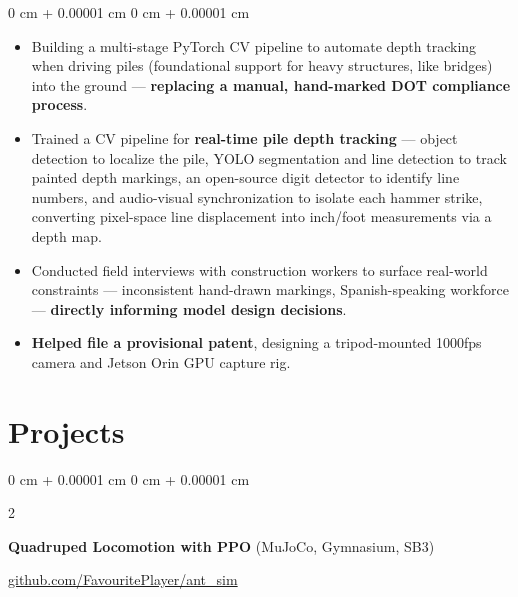 \documentclass[10pt, letterpaper]{article}
\newenvironment{highlights}{
    \begin{itemize}[
        topsep=0.3 cm,
        parsep=0.05 cm,
        partopsep=0pt,
        itemsep=0.02 cm,
        leftmargin=0 cm + 10pt
    ]
}{
    \end{itemize}
} %
\newenvironment{onecolentry}{
    \begin{adjustwidth}{
        0 cm + 0.00001 cm
    }{
        0 cm + 0.00001 cm
    }
}{
    \end{adjustwidth}
} %
\newenvironment{extendedtwocolentry}[2][]{
    \onecolentry
    \def\secondColumn{#2}
    \setcolumnwidth{\fill, 8 cm}
    \begin{paracol}{2}
}{
    \switchcolumn \raggedleft \secondColumn
    \end{paracol}
    \endonecolentry
}
\begin{document}
        \vspace{0.10 cm}
        \begin{onecolentry}
            \begin{highlights}
                \item Building a multi-stage PyTorch CV pipeline to automate depth tracking when driving piles (foundational support for heavy structures, like bridges) into the ground — \textbf{replacing a manual, hand-marked DOT compliance process}.
                \item Trained a CV pipeline for \textbf{real-time pile depth tracking} — object detection to localize the pile, YOLO segmentation and line detection to track painted depth markings, an open-source digit detector to identify line numbers, and audio-visual synchronization to isolate each hammer strike, converting pixel-space line displacement into inch/foot measurements via a depth map.
                \item Conducted field interviews with construction workers to surface real-world constraints — inconsistent hand-drawn markings, Spanish-speaking workforce — \textbf{directly informing model design decisions}.
                \item \textbf{Helped file a provisional patent}, designing a tripod-mounted 1000fps camera and Jetson Orin GPU capture rig.
            \end{highlights}
        \end{onecolentry}

    \section{Projects}

        \begin{extendedtwocolentry}{
            \href{https://github.com/FavouritePlayer/ant_sim}{github.com/FavouritePlayer/ant\_sim}
        }
            \textbf{Quadruped Locomotion with PPO} (MuJoCo, Gymnasium, SB3)
        \end{extendedtwocolentry}
\end{document}
